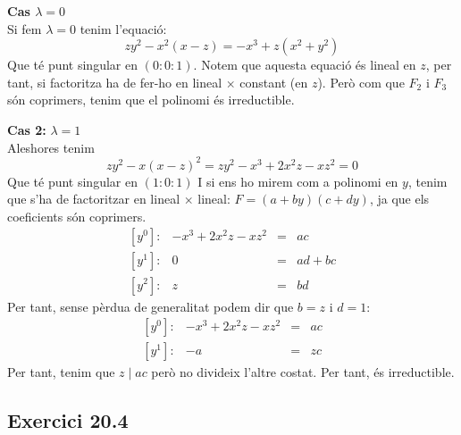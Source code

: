 \documentclass[11pt, a4paper]{article}
\begin{document}
\textbf{Cas $\lambda=0$}\\
Si fem $\lambda=0$ tenim l'equació:
\[
    zy^2-x^2(x-z)=-x^3+z(x^2+y^2)
\]
Que té punt singular en $(0:0:1)$. Notem que aquesta equació és lineal en $z$, per tant, si factoritza ha de fer-ho en lineal $\times$ constant (en $z$). Però com que $F_2$ i $F_3$ són coprimers, tenim que el polinomi és irreductible.\par
\textbf{Cas 2:} $\lambda=1$\\
Aleshores tenim 
\[
    zy^2-x(x-z)^2=zy^2-x^3+2x^2z-xz^2=0
\]
Que té punt singular en $(1:0:1)$ I si ens ho mirem com a polinomi en $y$, tenim que s'ha de factoritzar en lineal $\times$ lineal: $F=(a+by)(c+dy)$, ja que els coeficients són coprimers.\\
\[
    \begin{array}{lrcl}
       {[y^0]}:&-x^3+2x^2z-xz^2  & = &ac\\
       {[y^1]}:&0       & = &ad+bc\\
       {[y^2]}:&z & = &bd
    \end{array}
\]
Per tant, sense pèrdua de generalitat podem dir que $b=z$ i $d=1$:
\[
    \begin{array}{lrcl}
       {[y^0]}:&-x^3+2x^2z-xz^2  & = &ac\\
       {[y^1]}:&-a       & = &zc
    \end{array}
\]
Per tant, tenim que $z\mid ac$ però no divideix l'altre costat. Per tant, és irreductible.
\subsection{Exercici 20.4}
\end{document}
